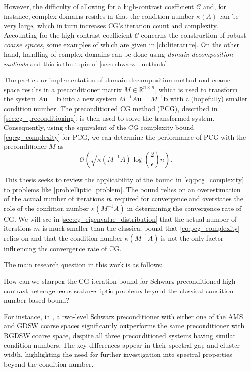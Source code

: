 However, the difficulty of allowing for a high-contrast coefficient $\mathcal{C}$ and, for instance, complex domains resides in that the condition number $\kappa(A)$ can be very large, which in turn increases CG's iteration count and complexity. Accounting for the high-contrast coefficient $\mathcal{C}$ concerns the construction of robust \textit{coarse spaces}, some examples of which are given in \cref{ch:literature}. On the other hand, handling of complex domains can be done using \textit{domain decomposition methods} and this is the topic of \cref{sec:schwarz_methods}. 

The particular implementation of domain decomposition method and coarse space results in a preconditioner matrix $M\in\mathbb{R}^{n \times n}$, which is used to transform the system $A\mathbf{u} = \mathbf{b}$ into a new system $M^{-1}A\mathbf{u} = M^{-1}\mathbf{b}$ with a (hopefully) smaller condition number. The preconditioned CG method (PCG), described in \cref{sec:cg_preconditioning}, is then used to solve the transformed system. Consequently, using the equivalent of the CG complexity bound \cref{eq:cg_complexity} for PCG, we can determine the performance of PCG with the preconditioner $M$ as
\begin{equation}
  \mathcal{O}\left(\sqrt{\kappa(M^{-1}A)}\log\left(\frac{2}{\epsilon}\right)n\right).
  \label{eq:pcg_complexity}
\end{equation}

This thesis seeks to review the applicability of the bound in \cref{eq:pcg_complexity} to problems like \cref{prob:elliptic_problem}. The bound relies on an overestimation of the actual number of iterations $m$ required for convergence and overstates the role of the condition number $\kappa(M^{-1}A)$ in determining the convergence rate of CG. We will see in \cref{sec:cg_eigenvalue_distribution} that the actual number of iterations $m$ is much smaller than the classical bound that \cref{eq:pcg_complexity} relies on and that the condition number $\kappa(M^{-1}A)$ is not the only factor influencing the convergence rate of CG. 

The main research question in this work is as follows:
\begin{researchq} \label{rq:main}
    \par
    How can we sharpen the CG iteration bound for Schwarz-preconditioned high-contrast heterogeneous scalar-elliptic problems beyond the classical condition number-based bound?
\end{researchq}
For instance, in \cite{ams_coarse_space_comp_study_Alves2024}, a two-level Schwarz preconditioner with either one of the AMS and GDSW coarse spaces significantly outperforms the same preconditioner with RGDSW coarse space, despite all three preconditioned systems having similar condition numbers. The key differences appear in their spectral gap and cluster width, highlighting the need for further investigation into spectral properties beyond the condition number.

